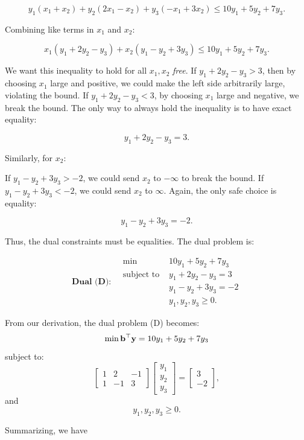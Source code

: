 \[
y_1(x_1 + x_2) + y_2(2x_1 - x_2) + y_3(-x_1 + 3x_2) \leq 10y_1 + 5y_2 + 7y_3.
\]

Combining like terms in $x_1$ and $x_2$:

\[
x_1(y_1 + 2y_2 - y_3) + x_2(y_1 - y_2 + 3y_3) \leq 10y_1 + 5y_2 + 7y_3.
\]

We want this inequality to hold for all $x_1, x_2$ \emph{free}. If $y_1 + 2y_2 - y_3 > 3$, then by choosing $x_1$ large and positive, we could make the left side arbitrarily large, violating the bound. If $y_1 + 2y_2 - y_3 < 3$, by choosing $x_1$ large and negative, we break the bound. The only way to always hold the inequality is to have exact equality:

\[
y_1 + 2y_2 - y_3 = 3.
\]

Similarly, for $x_2$:

If $y_1 - y_2 + 3y_3 > -2$, we could send $x_2$ to $-\infty$ to break the bound. If $y_1 - y_2 + 3y_3 < -2$, we could send $x_2$ to $\infty$. Again, the only safe choice is equality:

\[
y_1 - y_2 + 3y_3 = -2.
\]

Thus, the dual constraints must be equalities. The dual problem is:

\[
\textbf{Dual (D):} \quad
\begin{aligned}
\min \; & 10y_1 + 5y_2 + 7y_3 \\
\text{subject to } & y_1 + 2y_2 - y_3 = 3 \\
& y_1 - y_2 + 3y_3 = -2 \\
& y_1, y_2, y_3 \geq 0.
\end{aligned}
\]

From our derivation, the dual problem (D) becomes:
\[
\min \mathbf{b}^\top \mathbf{y} = 10y_1 + 5y_2 + 7y_3
\]
subject to:
\[
\begin{bmatrix}
1 & 2 & -1 \\
1 & -1 & 3
\end{bmatrix}
\begin{bmatrix}
y_1 \\ y_2 \\ y_3
\end{bmatrix}
=
\begin{bmatrix}
3 \\ -2
\end{bmatrix},
\]
and
\[
y_1, y_2, y_3 \geq 0.
\]

Summarizing, we have


